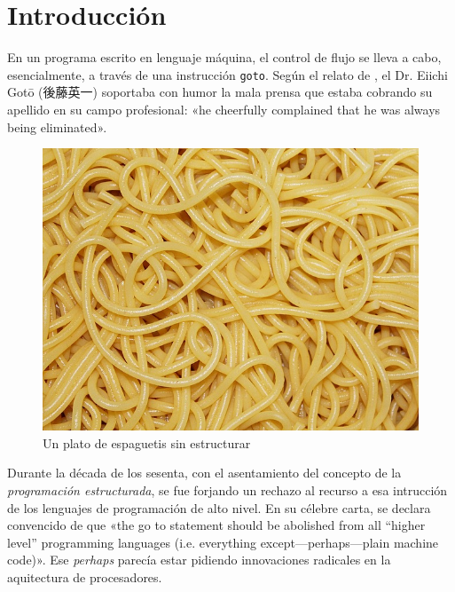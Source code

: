 \documentclass{tfg_domingo}
\begin{document}

\portada
\frontmatter
\gracias{}
\resumen{}{}
\tableofcontents

\mainmatter
\chapter{Introducción}

En un programa escrito en lenguaje máquina, el control de
flujo se lleva a cabo, esencialmente, a través de una
instrucción {\tt goto}. Según el relato de
\citet[p. 264]{1974_Knuth}, el Dr. Eiichi Gotō
%
%
({後藤英一}) soportaba con humor la mala
prensa que estaba cobrando su apellido en su campo
profesional: «he cheerfully complained that he was always
being eliminated».

\begin{figure}[ht!] %
\begin{center}
\includegraphics[width=.7\linewidth]{espaguetis}
\end{center}
\caption{Un plato de espaguetis sin estructurar}
\label{fig_pro}
\end{figure}


Durante la década de los sesenta, con el asentamiento del
concepto de la \emph{programación estructurada}, se fue
forjando un rechazo al recurso a esa intrucción de los
lenguajes de programación de alto nivel. En su célebre
carta, \citet{1968_Dijkstra} se declara convencido de que
«the go to statement should be abolished from all
  “higher level” programming languages (i.e. everything
  except—perhaps—plain machine code)». Ese \emph{perhaps}
parecía estar pidiendo innovaciones radicales en la
aquitectura de procesadores.
\end{document}
